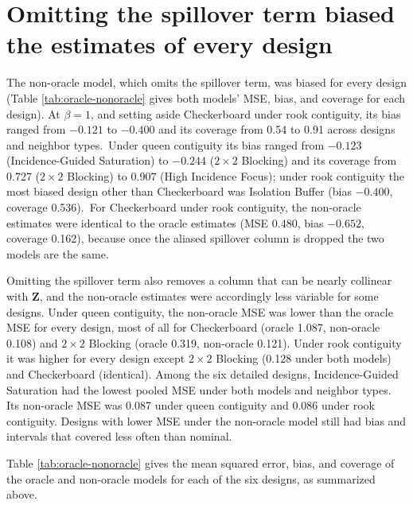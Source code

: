 \documentclass[11pt]{article}
\begin{document}
\FloatBarrier
\section{Omitting the spillover term biased the estimates of every design}\label{non-oracle-sensitivity-analysis}\label{app:oracle-nonoracle}


The non-oracle model, which omits the spillover term, was biased for
every design (Table \ref{tab:oracle-nonoracle}
gives both models' MSE, bias, and coverage
for each design). At \(\beta = 1\), and setting aside Checkerboard under
rook contiguity, its bias ranged from \(-0.121\) to \(-0.400\) and its
coverage from 0.54 to 0.91 across designs and neighbor types.\iffullsi\ Under
queen contiguity its bias ranged from \(-0.123\) (Incidence-Guided
Saturation) to \(-0.244\) (\(2\times2\) Blocking) and its
coverage from 0.727 (\(2\times2\) Blocking) to 0.907 (High Incidence Focus); under rook contiguity the most biased design other than
Checkerboard was Isolation Buffer (bias \(-0.400\), coverage 0.536).\fi\ For
Checkerboard under rook contiguity, the non-oracle estimates were
identical to the oracle estimates (MSE 0.480, bias \(-0.652\), coverage 0.162), because once the aliased spillover column is dropped the two
models are the same.

Omitting the spillover term also removes a column that can be nearly
collinear with \(\mathbf{Z}\), and the non-oracle estimates were accordingly less
variable for some designs. Under queen contiguity, the non-oracle MSE
was lower than the oracle MSE for every design, most of all for
Checkerboard (oracle 1.087, non-oracle 0.108) and \(2\times2\) Blocking
(oracle 0.319, non-oracle 0.121). Under rook contiguity it was higher
for every design except \(2\times2\) Blocking (0.128 under both models)
and Checkerboard (identical). Among the six detailed designs,
Incidence-Guided Saturation had the lowest pooled MSE under both
models and neighbor types. Its non-oracle MSE was 0.087 under queen
contiguity and 0.086 under rook contiguity. Designs with lower MSE
under the non-oracle model still had bias and intervals that covered
less often than nominal.

\iffullsi
Table \ref{tab:oracle-nonoracle}
gives the mean squared error, bias, and coverage of the oracle and
non-oracle models for each of the six designs, as summarized above.
\fi
\end{document}
